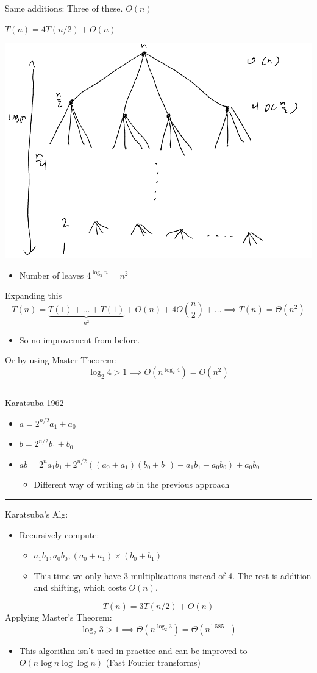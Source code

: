 \documentclass[11pt]{article}
\begin{document}
Same additions: Three of these. \(O(n)\)

\(T(n)=4T(n/2)+O(n)\)
\begin{center}
\includegraphics[width=.9\linewidth]{./Images/i79.png}
\end{center}
\begin{itemize}
\item Number of leaves \(4^{\log_2 n}=n^2\)
\end{itemize}
Expanding this
$$T(n)=\underbrace{T(1)+\ldots+T(1)}_{n^2}+O(n)+4O(\frac{n}{2})+\ldots \implies T(n)=\Theta(n^2)$$
\begin{itemize}
\item So no improvement from before.
\end{itemize}
Or by using Master Theorem:
$$\log_2 4 > 1 \implies O(n^{\log_2 4}) = O(n^2)$$

\noindent\rule{\textwidth}{0.5pt}
Karatsuba 1962
\begin{itemize}
\item \(a=2^{n/2}a_1+a_0\)
\item \(b=2^{n/2}b_1+b_0\)
\item \(ab=2^na_1b_1+2^{n/2}((a_0+a_1)(b_0+b_1)-a_1b_1-a_0b_0)+a_0b_0\)
\begin{itemize}
\item Different way of writing \(ab\) in the previous approach
\end{itemize}
\end{itemize}

\noindent\rule{\textwidth}{0.5pt}
Karatsuba's Alg:
\begin{itemize}
\item Recursively compute:
\begin{itemize}
\item \(a_1b_1,a_0b_0,(a_0+a_1)\times(b_0+b_1)\)
\item This time we only have 3 multiplications instead of 4. The rest is addition and shifting, which costs \(O(n)\).
\end{itemize}
\end{itemize}
$$T(n)=3T(n/2)+O(n)$$
Applying Master's Theorem: 
$$ \log_2 3 > 1 \implies \Theta(n^{\log_2 3}) = \Theta(n^{1.585\ldots})$$
\begin{itemize}
\item This algorithm isn't used in practice and can be improved to \(O(n \log n \log \log n)\) (Fast Fourier transforms)
\end{itemize}
\end{document}
